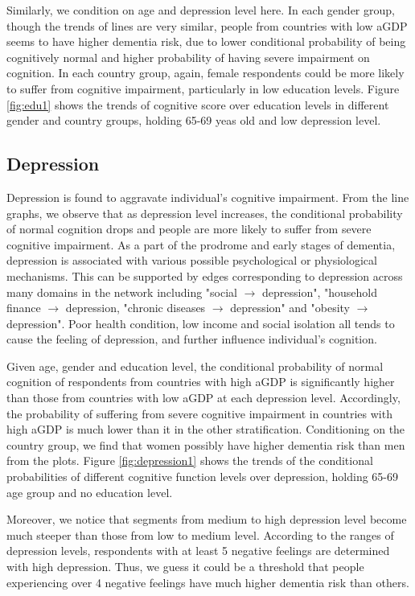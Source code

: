 \documentclass[11pt,twoside]{article}
\numberwithin{Theorem}{section}
\numberwithin{Definition}{section}
\numberwithin{Lemma}{section}
\numberwithin{Algorithm}{section}
\numberwithin{equation}{section}
\begin{document}
Similarly, we condition on age and depression level here. In each gender group, though the trends of lines are very similar, people from countries with low aGDP seems to have higher dementia risk, due to lower conditional probability of being cognitively normal and higher probability of having severe impairment on cognition. In each country group, again, female respondents could be more likely to suffer from cognitive impairment, particularly in low education levels. Figure \ref{fig:edu1} shows the trends of cognitive score over education levels in different gender and country groups, holding 65-69 yeas old and low depression level.

\subsection{Depression}

Depression is found to aggravate individual's cognitive impairment. From the line graphs, we observe that as depression level increases, the conditional probability of normal cognition drops and people are more likely to suffer from severe cognitive impairment. As a part of the prodrome and early stages of dementia, depression is associated with various possible psychological or physiological mechanisms. This can be supported by edges corresponding to depression across many domains in the network including "social $\rightarrow$ depression", "household finance $\rightarrow$ depression, "chronic diseases $\rightarrow$ depression" and "obesity $\rightarrow$ depression".  Poor health condition, low income and social isolation all tends to cause the feeling of depression, and further influence individual's cognition.

Given age, gender and education level, the conditional probability of normal cognition of respondents from countries with high aGDP is significantly higher than those from countries with low aGDP at each depression level. Accordingly, the probability of suffering from severe cognitive impairment in countries with high aGDP is much lower than it in the other stratification. Conditioning on the country group, we find that women possibly have higher dementia risk than men from the plots. Figure \ref{fig:depression1} shows the trends of the conditional probabilities of different cognitive function levels over depression, holding 65-69 age group and no education level.

Moreover, we notice that segments from medium to high depression level become much steeper than those from low to medium level. According to the ranges of depression levels, respondents with at least 5 negative feelings are determined with high depression. Thus, we guess it could be a threshold that people experiencing over 4 negative feelings have much higher dementia risk than others.
\end{document}
